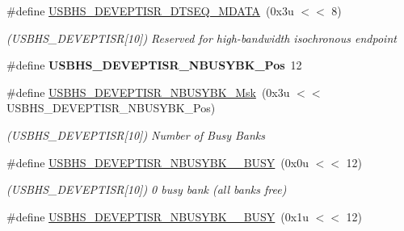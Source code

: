 \begin{DoxyCompactItemize}
\mbox{\label{group__SAMV71__USBHS_ga568eb6f4113642173ebcf3c303ad086e}} 
\#define \mbox{\hyperlink{group__SAMV71__USBHS_ga568eb6f4113642173ebcf3c303ad086e}{U\+S\+B\+H\+S\+\_\+\+D\+E\+V\+E\+P\+T\+I\+S\+R\+\_\+\+D\+T\+S\+E\+Q\+\_\+\+M\+D\+A\+TA}}~(0x3u $<$$<$ 8)
\begin{DoxyCompactList}\small\item\em (U\+S\+B\+H\+S\+\_\+\+D\+E\+V\+E\+P\+T\+I\+SR\mbox{[}10\mbox{]}) Reserved for high-\/bandwidth isochronous endpoint \end{DoxyCompactList}\item 
\mbox{\label{group__SAMV71__USBHS_gaa83d9b1cf59f18b0740871ce1541b398}} 
\#define {\bfseries U\+S\+B\+H\+S\+\_\+\+D\+E\+V\+E\+P\+T\+I\+S\+R\+\_\+\+N\+B\+U\+S\+Y\+B\+K\+\_\+\+Pos}~12
\item 
\mbox{\label{group__SAMV71__USBHS_ga4119a6fbd21e0fa7cdc7260da0996337}} 
\#define \mbox{\hyperlink{group__SAMV71__USBHS_ga4119a6fbd21e0fa7cdc7260da0996337}{U\+S\+B\+H\+S\+\_\+\+D\+E\+V\+E\+P\+T\+I\+S\+R\+\_\+\+N\+B\+U\+S\+Y\+B\+K\+\_\+\+Msk}}~(0x3u $<$$<$ U\+S\+B\+H\+S\+\_\+\+D\+E\+V\+E\+P\+T\+I\+S\+R\+\_\+\+N\+B\+U\+S\+Y\+B\+K\+\_\+\+Pos)
\begin{DoxyCompactList}\small\item\em (U\+S\+B\+H\+S\+\_\+\+D\+E\+V\+E\+P\+T\+I\+SR\mbox{[}10\mbox{]}) Number of Busy Banks \end{DoxyCompactList}\item 
\mbox{\label{group__SAMV71__USBHS_ga1d6f576b3dd9ea1df914ac0f6955a12e}} 
\#define \mbox{\hyperlink{group__SAMV71__USBHS_ga1d6f576b3dd9ea1df914ac0f6955a12e}{U\+S\+B\+H\+S\+\_\+\+D\+E\+V\+E\+P\+T\+I\+S\+R\+\_\+\+N\+B\+U\+S\+Y\+B\+K\+\_\+\_\+\+B\+U\+SY}}~(0x0u $<$$<$ 12)
\begin{DoxyCompactList}\small\item\em (U\+S\+B\+H\+S\+\_\+\+D\+E\+V\+E\+P\+T\+I\+SR\mbox{[}10\mbox{]}) 0 busy bank (all banks free) \end{DoxyCompactList}\item 
\mbox{\label{group__SAMV71__USBHS_gaa68c69091069c73fd28083895e80d878}} 
\#define \mbox{\hyperlink{group__SAMV71__USBHS_gaa68c69091069c73fd28083895e80d878}{U\+S\+B\+H\+S\+\_\+\+D\+E\+V\+E\+P\+T\+I\+S\+R\+\_\+\+N\+B\+U\+S\+Y\+B\+K\+\_\+\_\+\+B\+U\+SY}}~(0x1u $<$$<$ 12)

\end{DoxyCompactItemize}
